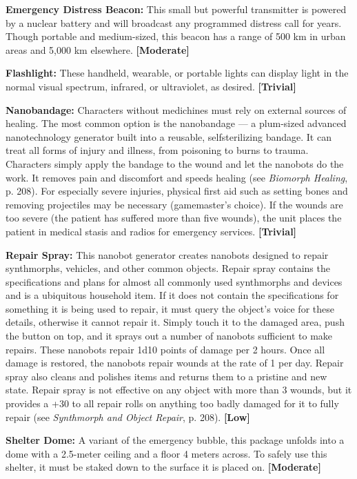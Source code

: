 \textbf{Emergency Distress Beacon:} This small but powerful transmitter is powered by a nuclear battery and will broadcast any programmed distress call for years. Though portable and medium-sized, this beacon has a range of 500 km in urban areas and 5,000 km elsewhere. \textbf{[Moderate]} 

\textbf{Flashlight:} These handheld, wearable, or portable lights can display light in the normal visual spectrum, infrared, or ultraviolet, as desired. \textbf{[Trivial]} 

\textbf{Nanobandage:} Characters without medichines must rely on external sources of healing. The most common option is the nanobandage --- a plum-sized advanced nanotechnology generator built into a reusable, selfsterilizing bandage. It can treat all forms of injury and illness, from poisoning to burns to trauma. Characters simply apply the bandage to the wound and let the nanobots do the work. It removes pain and discomfort and speeds healing (see \emph{Biomorph Healing}, p. 208). For especially severe injuries, physical first aid such as setting bones and removing projectiles may be necessary (gamemaster’s choice). If the wounds are too severe (the patient has suffered more than five wounds), the unit places the patient in medical stasis and radios for emergency services. \textbf{[Trivial]} 

\textbf{Repair Spray:} This nanobot generator creates nanobots designed to repair synthmorphs, vehicles, and other common objects. Repair spray contains the specifications and plans for almost all commonly used synthmorphs and devices and is a ubiquitous household item. If it does not contain the specifications for something it is being used to repair, it must query the object’s voice for these details, otherwise it cannot repair it. Simply touch it to the damaged area, push the button on top, and it sprays out a number of nanobots sufficient to make repairs. These nanobots repair 1d10 points of damage per 2 hours. Once all damage is restored, the nanobots repair wounds at the rate of 1 per day. Repair spray also cleans and polishes items and returns them to a pristine and new state. Repair spray is not effective on any object with more than 3 wounds, but it provides a +30 to all repair rolls on anything too badly damaged for it to fully repair (see \emph{Synthmorph and Object Repair}, p. 208). \textbf{[Low]} 

\textbf{Shelter Dome:} A variant of the emergency bubble, this package unfolds into a dome with a 2.5-meter ceiling and a floor 4 meters across. To safely use this shelter, it must be staked down to the surface it is placed on. \textbf{[Moderate]} 

